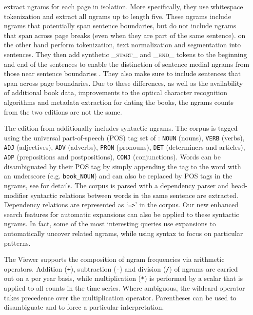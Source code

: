 \documentclass[11pt,a4paper]{article}
\newcommand{\query}[1]{\texttt{#1}}
\begin{document}
 extract ngrams for each page in isolation. More specifically, they use whitespace tokenization and extract all ngrams up to length five. These ngrams include ngrams that potentially span sentence boundaries, but do not include ngrams that span across page breaks (even when they are part of the same sentence).
 on the other hand perform tokenization, text normalization and segmentation into sentences. They then add synthetic \textsf{\textsc{\_start\_}} and \textsf{\textsc{\_end\_}} tokens to the beginning and end of the sentences to enable the distinction of sentence medial ngrams from those near sentence boundaries \cite{lin2012syntactic}. They also make sure to include sentences that span across page boundaries. Due to these differences, as well as the availability of additional book data, improvements to the optical character recognition algorithms and metadata extraction for dating the books, the ngrams counts from the two editions are not the same.

The edition from  additionally includes syntactic ngrams. The corpus is tagged using the universal part-of-speech (POS) tag set of : \query{NOUN} (nouns), \query{VERB} (verbs), \query{ADJ} (adjectives), \query{ADV} (adverbs), \query{PRON} (pronouns), \query{DET} (determiners and articles), \query{ADP} (prepositions and postpositions), \query{CONJ} (conjunctions). Words can be disambiguated by their POS tag by simply appending the tag to the word with an underscore (e.g. \texttt{book\_NOUN}) and can also be replaced by POS tags in the ngrams, see  for details. The corpus is  parsed with a dependency parser and head-modifier syntactic relations between words in the same sentence are extracted. Dependency relations are represented as `\query{=>}' in the corpus. Our new enhanced search features for automatic expansions can also be applied to these syntactic ngrams. In fact, some of the most interesting queries use expansions to automatically uncover related ngrams, while using syntax to focus on particular patterns.

The Viewer supports the composition of ngram frequencies via arithmetic operators. Addition (\query{+}), subtraction (\query{-}) and division (\query{/}) of ngrams are carried out on a per year basis, while multiplication (\query{*}) is performed by a scalar that is applied to all counts in the time series. Where ambiguous, the wildcard operator takes precedence over the multiplication operator. Parentheses can be used to disambiguate and to force a particular interpretation.
\end{document}
